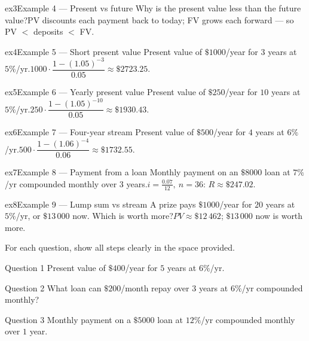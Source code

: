 \documentclass[11pt]{article}
\begin{document}
\begin{example}{ex3}{Example 4 --- Present vs future}
Why is the present value less than the future value?\soln PV discounts each payment back to today; FV grows each forward — so PV $<$ deposits $<$ FV.
\end{example}

\begin{example}{ex4}{Example 5 --- Short present value}
Present value of $\$1000$/year for $3$ years at $5\%$/yr.\soln $1000\cdot\dfrac{1-(1.05)^{-3}}{0.05}\approx\$2723.25$.
\end{example}

\begin{example}{ex5}{Example 6 --- Yearly present value}
Present value of $\$250$/year for $10$ years at $5\%$/yr.\soln $250\cdot\dfrac{1-(1.05)^{-10}}{0.05}\approx\$1930.43$.
\end{example}

\begin{example}{ex6}{Example 7 --- Four-year stream}
Present value of $\$500$/year for $4$ years at $6\%$/yr.\soln $500\cdot\dfrac{1-(1.06)^{-4}}{0.06}\approx\$1732.55$.
\end{example}

\begin{example}{ex7}{Example 8 --- Payment from a loan}
Monthly payment on an $\$8000$ loan at $7\%$/yr compounded monthly over $3$ years.\soln $i=\tfrac{0.07}{12},\ n=36$: $R\approx\$247.02$.
\end{example}

\begin{example}{ex8}{Example 9 --- Lump sum vs stream}
A prize pays $\$1000$/year for $20$ years at $5\%$/yr, or $\$13\,000$ now. Which is worth more?\soln $PV\approx\$12\,462$; $\$13\,000$ now is worth more.
\end{example}

\clearpage
{}
For each question, show all steps clearly in the space provided.

\begin{qbox}{Question 1}
Present value of $\$400$/year for $5$ years at $6\%$/yr.\workspace{2.4cm}
\end{qbox}

\begin{qbox}{Question 2}
What loan can $\$200$/month repay over $3$ years at $6\%$/yr compounded monthly?\workspace{2.4cm}
\end{qbox}

\begin{qbox}{Question 3}
Monthly payment on a $\$5000$ loan at $12\%$/yr compounded monthly over $1$ year.\workspace{2.4cm}
\end{qbox}
\end{document}

